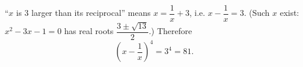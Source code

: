 ``$x$ is $3$ larger than its reciprocal'' means $x=\dfrac{1}{x}+3$, i.e. $x-\dfrac{1}{x}=3$. (Such $x$ exist: $x^2-3x-1=0$ has real roots $\dfrac{3\pm\sqrt{13}}{2}$.) Therefore
\[
\left(x-\dfrac{1}{x}\right)^4=3^4=\boxed{81}.
\]
